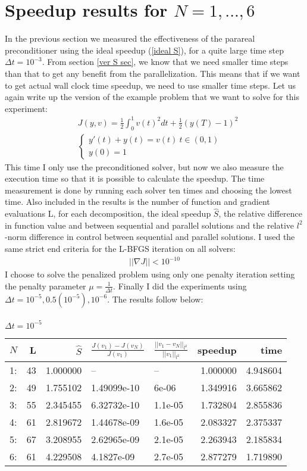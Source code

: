 \section{Speedup results for $N=1,...,6$}
In the previous section we measured the effectiveness of the parareal preconditioner using the ideal speedup (\ref{ideal S}), for a quite large time step $\Delta t =10^{-3}$. From section \ref{ver S sec}, we know that we need smaller time steps than that to get any benefit from the parallelization. This means that if we want to get actual wall clock time speedup, we need to use smaller time steps. Let us again write up the version of the example problem that we want to solve for this experiment:
\begin{align*}
&J(y,v) = \frac{1}{2}\int_0^1v(t)^2dt + \frac{1}{2}(y(T)-1)^2 \\
&\left\{
     \begin{array}{lr}
       	y'(t)+y(t) = v(t) \ t\in(0,1)\\
       	y(0)=1
     \end{array}
   \right. 
\end{align*}
This time I only use the preconditioned solver, but now we also measure the execution time so that it is possible to calculate the speedup. The time measurement is done by running each solver ten times and choosing the lowest time. Also included in the results is the number of function and gradient evaluations L, for each decomposition, the ideal speedup $\hat S$, the relative difference in function value and between sequential and parallel solutions and the relative $l^2$-norm difference in control between sequential and parallel solutions. I used the same strict end criteria for the L-BFGS iteration on all solvers:
\begin{align*}
||\nabla J||<10^{-10}
\end{align*}
I choose to solve the penalized problem using only one penalty iteration setting the penalty parameter $\mu=\frac{1}{\Delta t}$. Finally I did the experiments using $\Delta t =10^{-5},0.5(10^{-5}),10^{-6}$. The results follow below:
\\
\\
$\Delta t = 10^{-5}$
\\
\begin{tabular}{lrrllrr}
\toprule
{} $N$&   L &        $\hat S$ &          $\frac{J(v_1)-J(v_N)}{J(v_1)}$ &    $\frac{||v_1-v_N||_{l^2}}{||v_1||_{l^2}}$&   speedup &      time \\
\midrule
1:  &  43 &  1.000000 &           -- &       -- &  1.000000 &  4.948604 \\
2: &  49 &  1.755102 &  1.49099e-10 &    6e-06 &  1.349916 &  3.665862 \\
3: &  55 &  2.345455 &  6.32732e-10 &  1.1e-05 &  1.732804 &  2.855836 \\
4: &  61 &  2.819672 &  1.44678e-09 &  1.6e-05 &  2.083327 &  2.375337 \\
5: &  67 &  3.208955 &  2.62965e-09 &  2.1e-05 &  2.263943 &  2.185834 \\
6: &  61 &  4.229508 &   4.1827e-09 &  2.7e-05 &  2.877279 &  1.719890 \\
\bottomrule
\end{tabular}
